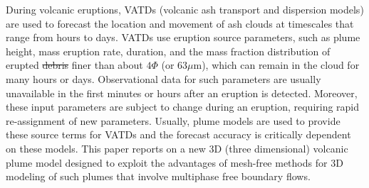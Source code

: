 \documentclass[gmd, manuscript]{copernicus} %
\providecommand{\DIFadd}[1]{{\protect\color{blue}\uwave{#1}}} %
\providecommand{\DIFdel}[1]{{\protect\color{red}\sout{#1}}}                      %
\providecommand{\DIFaddbegin}{} %
\providecommand{\DIFaddend}{} %
\providecommand{\DIFdelbegin}{} %
\providecommand{\DIFdelend}{} %
\begin{document}
During volcanic eruptions, VATDs (volcanic ash transport and dispersion models) are used to forecast the location and movement of ash clouds at timescales that range from hours to days. VATDs use eruption source parameters, such as plume height, mass eruption rate, duration, and the mass fraction distribution of erupted \DIFdelbegin \DIFdel{debris }\DIFdelend \DIFaddbegin \DIFadd{particles }\DIFaddend finer than about $4 \Phi$ (or \DIFdelbegin \DIFdel{$63  \mu$}\DIFdelend \DIFaddbegin \DIFadd{$62.5 \mu$}\DIFaddend m), which can remain in the cloud for many hours or days. Observational data for such parameters are usually unavailable in the first minutes or hours after an eruption is detected. Moreover, these input parameters are subject to change during an eruption, requiring rapid re-assignment of new parameters. Usually, plume models are used to provide these source terms for VATDs and the forecast accuracy is critically dependent on these models. This paper reports on a new 3D (three dimensional) volcanic plume model designed to exploit the advantages of mesh-free methods for 3D modeling of such plumes that involve multiphase free boundary flows.

\end{document}
